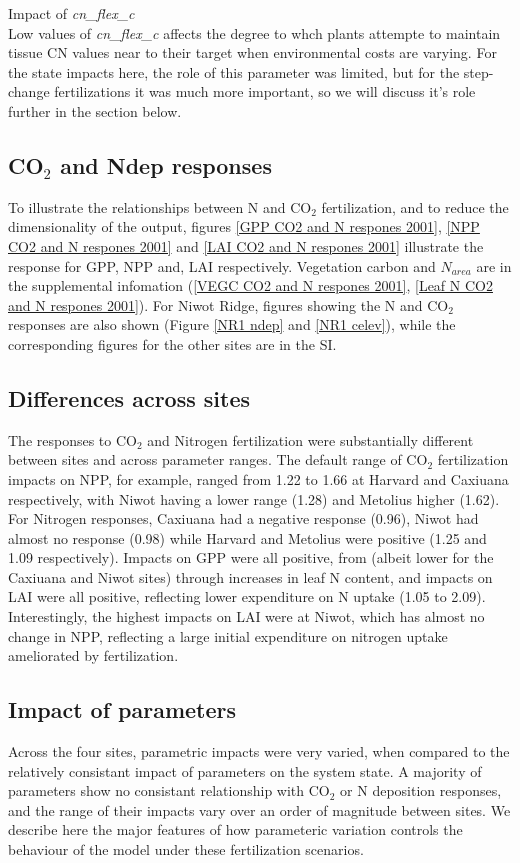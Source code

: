 \documentclass[draft,linenumbers]{agujournal}
\begin{document}
Impact of \emph{cn\_flex\_c}\\
 Low values of \emph{cn\_flex\_c} affects the degree to whch plants attempte to maintain tissue CN values near to their target when environmental costs are varying. For the state impacts here, the role of this parameter was limited, but for the step-change fertilizations it was much more important, so we will discuss it's role further in the section below. 

\subsection{CO$_{2}$ and Ndep responses}

To illustrate the relationships between N and CO$_{2}$ fertilization, and to reduce the dimensionality of the output, figures \ref{GPP CO2 and N respones 2001}, \ref{NPP CO2 and N respones 2001} and \ref{LAI CO2 and N respones 2001} illustrate the response for GPP, NPP and, LAI respectively. Vegetation carbon and $N_{area}$ are in the supplemental infomation (\ref{VEGC CO2 and N respones 2001}, \ref{Leaf N CO2 and N respones 2001}).  For Niwot Ridge, figures showing the N and CO$_{2}$ responses are also shown (Figure \ref{NR1 ndep} and \ref{NR1 celev}), while the corresponding figures for the other sites are in the SI.

\subsection{Differences across sites}
The responses to CO$_{2}$ and Nitrogen fertilization were substantially different between sites and across parameter ranges. The default range of CO$_{2}$ fertilization impacts on NPP, for example, ranged from 1.22 to 1.66 at Harvard and Caxiuana respectively, with Niwot having a lower range (1.28) and Metolius higher (1.62). For Nitrogen responses, Caxiuana had a negative response (0.96), Niwot had almost no response (0.98) while Harvard and Metolius were positive (1.25 and 1.09 respectively). Impacts on GPP were all positive, from  (albeit lower for the Caxiuana and Niwot sites) through increases in leaf N content, and impacts on LAI were all positive, reflecting lower expenditure on N uptake (1.05 to 2.09). Interestingly, the highest impacts on LAI were at Niwot, which has almost no change in NPP, reflecting a large initial expenditure on nitrogen uptake ameliorated by fertilization.   
 
\subsection{Impact of parameters}
Across the four sites, parametric impacts were very varied, when compared to the relatively consistant impact of parameters on the system state. A majority of parameters show no consistant relationship with CO$_{2}$ or N deposition responses, and the range of their impacts vary over an order of magnitude between sites.  We describe here the major features of how parameteric variation controls the behaviour of the model under these fertilization scenarios.
\end{document}
